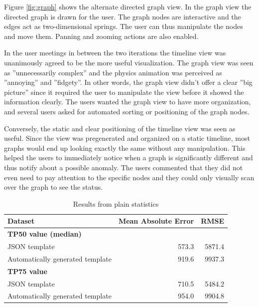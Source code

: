 Figure \ref{fig:graph} shows the alternate directed graph view. In the graph view the directed graph is drawn for the user. The graph nodes are interactive and the edges act as two-dimensional springs.
The user can thus manipulate the nodes and move them. Panning and zooming actions are also enabled.

In the user meetings in between the two iterations the timeline view was unanimously agreed to be the more useful visualization. The graph view was seen as ''unnecessarily complex'' and the physics animation was perceived as ''annoying'' and ''fidgety''. 
In other words, the graph view didn't offer a clear ''big picture'' since it required the user to manipulate the view before it showed the information clearly. 
The users wanted the graph view to have more organization, and several users asked for automated sorting or positioning of the graph nodes.

Conversely, the static and clear positioning of the timeline view was seen as useful.
Since the view was pregenerated and organized on a static timeline, most graphs would end up looking exactly the same without any manipulation.
This helped the users to immediately notice when a graph is significantly different and thus notify about a possible anomaly.
The users commented that they did not even need to pay attention to the specific nodes and they could only visually scan over the graph to see the status.


\begin{table}[htb]
\begin{center}
\begin{tabularx}{\linewidth}{| X | r | r |}
\hline
Dataset & Mean Absolute Error & RMSE \\
\hline
\textbf{TP50 value (median)} &  & \\
JSON template                       & 573.3 & 5871.4 \\
Automatically generated template    & 919.6 & 9937.3 \\
\hline
\textbf{TP75 value} &  & \\
JSON template                       & 710.5 & 5484.2 \\
Automatically generated template    & 954.0 & 9904.8 \\
\hline
\end{tabularx}
\end{center}
\caption{Results from plain statistics}
\label{tab:statresults}
\end{table}

